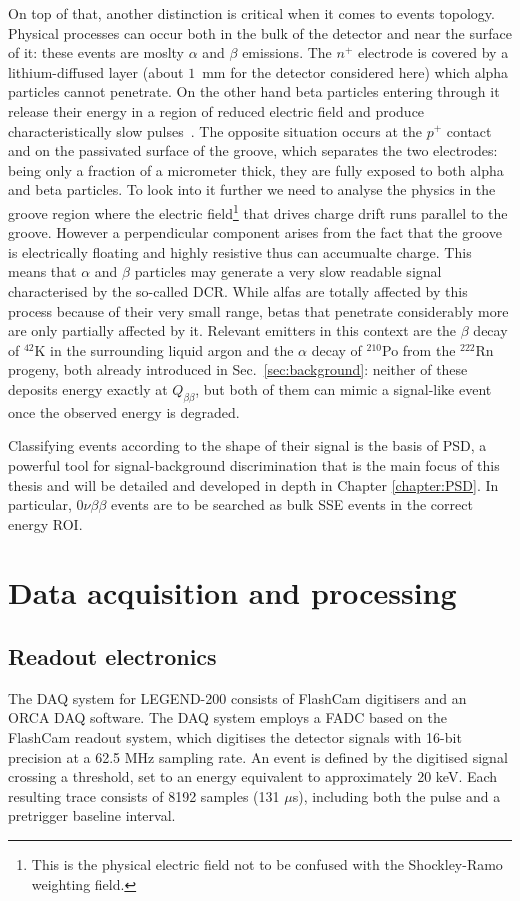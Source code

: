 On top of that, another distinction is critical when it comes to events topology. Physical processes can occur both in the bulk of the detector and near the surface of it: these events are moslty $\alpha$ and $\beta$ emissions. The $n^+$ electrode is covered by a lithium-diffused layer (about $1$~mm for the detector considered here) which alpha particles cannot penetrate. On the other hand beta particles entering through it release their energy in a region of reduced electric field and produce characteristically slow pulses~\cite{L1000-design}. The opposite situation occurs at the $p^+$ contact and on the passivated surface of the groove, which separates the two electrodes: being only a fraction of a micrometer thick, they are fully exposed to both alpha and beta particles. To look into it further we need to analyse the physics in the groove region where the electric field\footnote{This is the physical electric field not to be confused with the Shockley-Ramo weighting field.} that drives charge drift runs parallel to the groove. However a perpendicular component arises from the fact that the groove is electrically floating and highly resistive thus can accumualte charge. This means that $\alpha$ and $\beta$ particles may generate a very slow readable signal characterised by the so-called \ac{DCR}. While alfas are totally affected by this process because of their very small range, betas that penetrate considerably more are only partially affected by it. Relevant emitters in this context are the $\beta$ decay of $^{42}$K in the surrounding liquid argon and the $\alpha$ decay of $^{210}$Po from the $^{222}$Rn progeny, both already introduced in Sec.~\ref{sec:background}: neither of these deposits energy exactly at $Q_{\beta\beta}$, but both of them can mimic a signal-like event once the observed energy is degraded. 

Classifying events according to the shape of their signal is the basis of \ac{PSD}, a powerful tool for signal-background discrimination that is the main focus of this thesis and will be detailed and developed in depth in Chapter \ref{chapter:PSD}. In particular, 0$\nu\beta\beta$ events are to be searched as bulk \ac{SSE} events in the correct energy \ac{ROI}.

\section{Data acquisition and processing}
\subsection{Readout electronics}
The \ac{DAQ} system for LEGEND-200 consists of FlashCam digitisers and an \ac{ORCA} \ac{DAQ} software. The \ac{DAQ} system employs a \ac{FADC} based on the FlashCam readout system, which digitises the detector signals with 16-bit precision at a 62.5 MHz sampling rate. An event is defined by the digitised signal crossing a threshold, set to an energy equivalent to approximately 20 keV. Each resulting trace consists of 8192 samples (131 $\mu$s), including both the pulse and a pretrigger baseline interval. \cite{LEGEND:GeDet} 

